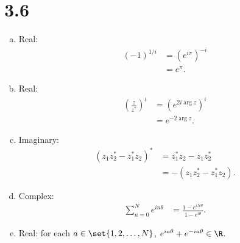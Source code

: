 \documentclass[10pt]{mypackage}
\begin{document}
\section{3.6}%
\begin{enumerate}[(a)]
  \item Real:
    \begin{align*}
      \left(-1\right)^{1/i} &= \left(e^{i\pi}\right)^{-i}\\
                            &= e^{\pi}.
    \end{align*}
  \item Real:
    \begin{align*}
      \left(\frac{z}{z^{\ast}}\right)^{i} &= \left(e^{2i\arg z}\right)^{i}\\
                                          &= e^{-2\arg z}.
    \end{align*}
  \item Imaginary:
    \begin{align*}
      \left(z_1z_2^{\ast} - z_1^{\ast}z_2\right)^{\ast}&= z_1^{\ast}z_2 - z_1z_2^{\ast}\\
                                                       &= -\left(z_1z_2^{\ast} - z_1^{\ast}z_2\right).
    \end{align*}
  \item Complex: 
    \begin{align*}
      \sum_{n=0}^{N}e^{in\theta} &= \frac{1 - e^{iN\theta}}{1 - e^{i\theta}}.
    \end{align*}
  \item Real: for each $a\in \set{1,2,\dots,N}$, $e^{ia\theta} + e^{-ia\theta} \in \R$.
\end{enumerate}
\end{document}
